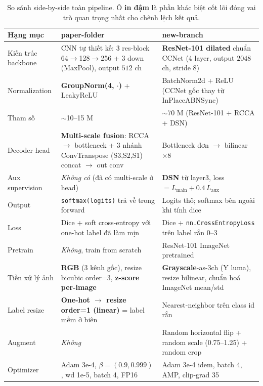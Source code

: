 \documentclass[12pt,a4paper]{article}
\begin{document}
\begin{table}[H]
\centering
\small
\caption{So sánh side-by-side toàn pipeline. Ô \textbf{in đậm} là phần khác biệt cốt
lõi đóng vai trò quan trọng nhất cho chênh lệch kết quả.}
\label{tab:overall}
\begin{tabular}{p{3.3cm} p{5.4cm} p{5.4cm}}
\toprule
\textbf{Hạng mục} & \textbf{paper-folder} & \textbf{new-branch} \\
\midrule
Kiến trúc backbone &
  CNN tự thiết kế: 3 res-block 64$\to$128$\to$256 + 3 down (MaxPool), output $512$ ch &
  \textbf{ResNet-101 dilated} chuẩn CCNet (4 layer, output $2048$ ch, stride 8) \\
\addlinespace
Normalization &
  \textbf{GroupNorm(4, $\cdot$)} + LeakyReLU &
  BatchNorm2d + ReLU (CCNet gốc thay từ InPlaceABNSync) \\
\addlinespace
Tham số &
  $\sim$10--15 M &
  $\sim$70 M (ResNet-101 + RCCA + DSN) \\
\addlinespace
Decoder head &
  \textbf{Multi-scale fusion}: RCCA $\to$ bottleneck + 3 nhánh ConvTranspose (S3,S2,S1)
  concat $\to$ out conv &
  Bottleneck đơn $\to$ bilinear $\times 8$ \\
\addlinespace
Aux supervision &
  \emph{Không có} (đã có multi-scale ở head) &
  \textbf{DSN} từ layer3, loss $= L_{\text{main}} + 0.4\,L_{\text{aux}}$ \\
\addlinespace
Output &
  \texttt{softmax(logits)} trả về trong forward &
  Logits thô; softmax bên ngoài khi tính dice \\
\addlinespace
Loss &
  Dice + soft cross-entropy với one-hot label đã làm mịn &
  Dice + \texttt{nn.CrossEntropyLoss} trên label rắn 0--3 \\
\addlinespace
Pretrain &
  \emph{Không}, train from scratch &
  ResNet-101 ImageNet pretrained \\
\addlinespace
Tiền xử lý ảnh &
  \textbf{RGB} (3 kênh gốc), resize bicubic order=3, \textbf{z-score per-image} &
  \textbf{Grayscale}-as-3ch (Y luma), resize bilinear, chuẩn hoá ImageNet mean/std \\
\addlinespace
Label resize &
  \textbf{One-hot $\to$ resize order=1 (linear)} = label mềm ở biên &
  Nearest-neighbor trên class id rắn \\
\addlinespace
Augment &
  \emph{Không} &
  Random horizontal flip + random scale (0.75--1.25) + random crop \\
\addlinespace
Optimizer & Adam 3e-4, $\beta=(0.9,0.999)$, wd 1e-5, batch 4, FP16 &
                Adam 3e-4 idem, batch 4, AMP, clip-grad 35 \\

\end{tabular}
\end{table}
\end{document}
